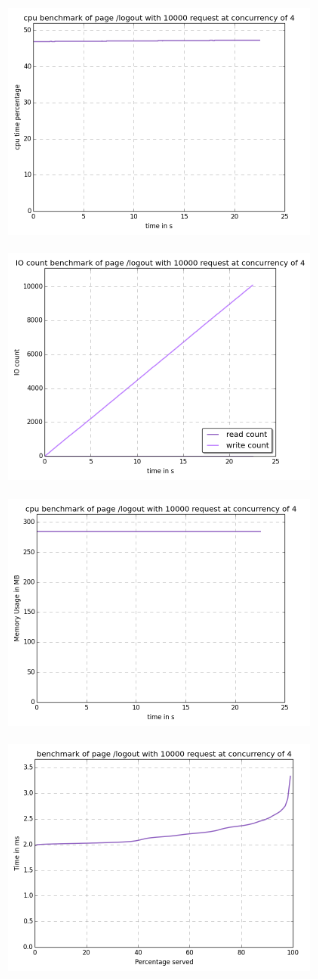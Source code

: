 \begin{center}
\includegraphics[width=0.6\textwidth]{img/logout.cpu.png}



\includegraphics[width=0.6\textwidth]{img/logout.io-count.png}



\includegraphics[width=0.6\textwidth]{img/logout.mem.png}



\includegraphics[width=0.6\textwidth]{img/logout.serv-time.png}




\end{center}
